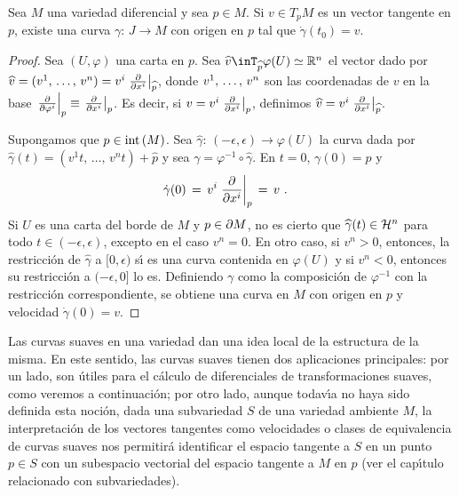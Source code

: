 \begin{propoTodoTangenteEsVelocidad}\label{thm:todotangenteesvelocidad}
	Sea $M$ una variedad diferencial y sea $p\in M$. Si $v\in T_{p}M$
	es un vector tangente en $p$, existe una curva
	$\gamma:\,J\rightarrow M$ con origen en $p$ tal que
	$\dot{\gamma}(t_{0})=v$.
\end{propoTodoTangenteEsVelocidad}

\begin{proof}
	Sea $(U,\varphi)$ una carta en $p$. Sea $\widehat{v}\in%
	T_{\widehat{p}}\varphi(U)\simeq\bb{R}^{n}$ el vector dado por
	$\widehat{v}=(\lista*{v}{n})=v^{i}\gancho[\widehat{p}]{x^{i}}$,
	donde $\lista*{v}{n}$ son las coordenadas de $v$ en la base
	$\gancho[p]{\varphi^{i}}\equiv\gancho[p]{x^{i}}$. Es decir, si
	$v=v^{i}\gancho[p]{x^{i}}$, definimos
	$\widehat{v}=v^{i}\gancho[\widehat{p}]{x^{i}}$.

	Supongamos que $p\in\interior{M}$. Sea $\widehat{\gamma}:\,%
	(-\epsilon,\epsilon)\rightarrow\varphi(U)$ la curva dada por
	$\widehat{\gamma}(t)=(v^{1}t,\,\dots,\,v^{n}t)+\widehat{p}$ y
	sea $\gamma=\varphi^{-1}\circ\widehat{\gamma}$. En $t=0$,
	$\gamma(0)=p$ y
	\begin{align*}
		\dot{\gamma}(0) & \,=\,v^{i}\gancho[p]{x^{i}} \,=\,v
		\text{ .}
	\end{align*}
	Si $U$ es una carta del borde de $M$ y $p\in\borde[M]$, no es cierto
	que $\widehat{\gamma}(t)\in\hemi[n]$ para todo
	$t\in(-\epsilon,\epsilon)$, excepto en el caso $v^{n}=0$. En otro
	caso, si $v^{n}>0$, entonces, la restricci\'{o}n de
	$\widehat{\gamma}$ a $[0,\epsilon)$ s\'{\i} es una curva
	contenida en $\varphi(U)$ y si $v^{n}<0$, entonces su
	restricci\'{o}n a $(-\epsilon,0]$ lo es. Definiendo $\gamma$
	como la composici\'{o}n de $\varphi^{-1}$ con la restricci\'{o}n
	correspondiente, se obtiene una curva en $M$ con origen en $p$
	y velocidad $\dot{\gamma}(0)=v$.
\end{proof}

Las curvas suaves en una variedad dan una idea local de la estructura de la
misma. En este sentido, las curvas suaves tienen dos aplicaciones
principales: por un lado, son \'{u}tiles para el c\'{a}lculo de diferenciales
de transformaciones suaves, como veremos a continuaci\'{o}n; por otro
lado, aunque todav\'{\i}a no haya sido definida esta noci\'{o}n, dada
una subvariedad $S$ de una variedad ambiente $M$, la interpretaci\'{o}n
de los vectores tangentes como velocidades o clases de equivalencia de
curvas suaves nos permitir\'{a} identificar el espacio tangente a $S$ en
un punto $p\in S$ con un subespacio vectorial del espacio tangente a $M$
en $p$ (ver el cap\'{\i}tulo relacionado con subvariedades).

